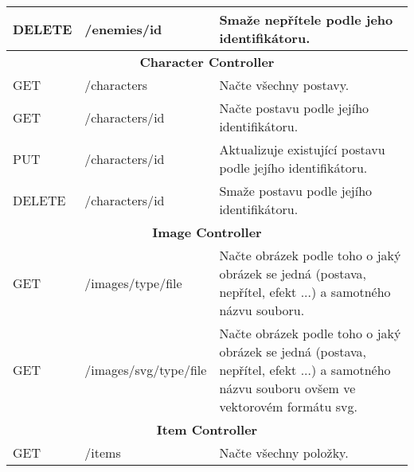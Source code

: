 \begin{longtable}{|l|l|p{}|}
    DELETE          & /enemies/{id}                          & Smaže nepřítele podle jeho identifikátoru.                                                                                                 \\
    \hline
    \multicolumn{3}{|c|}{\textbf{Character Controller}}                                                                                                                                                   \\
    \hline
    GET             & /characters                            & Načte všechny postavy.                                                                                                                     \\
    GET             & /characters/{id}                       & Načte postavu podle jejího identifikátoru.                                                                                                 \\
    PUT             & /characters/{id}                       & Aktualizuje existující postavu podle jejího identifikátoru.                                                                                \\
    DELETE          & /characters/{id}                       & Smaže postavu podle jejího identifikátoru.                                                                                                 \\
    \hline
    \multicolumn{3}{|c|}{\textbf{Image Controller}}                                                                                                                                                       \\
    \hline
    GET             & /images/{type}/{file}                  & Načte obrázek podle toho o jaký obrázek se jedná (postava, nepřítel, efekt ...) a samotného názvu souboru.                                 \\
    GET             & /images/svg/{type}/{file}              & Načte obrázek podle toho o jaký obrázek se jedná (postava, nepřítel, efekt ...) a samotného názvu souboru ovšem ve vektorovém formátu svg. \\
    \hline
    \multicolumn{3}{|c|}{\textbf{Item Controller}}                                                                                                                                                        \\
    \hline
    GET             & /items                                 & Načte všechny položky.                                                                                                                     \\

\end{longtable}

